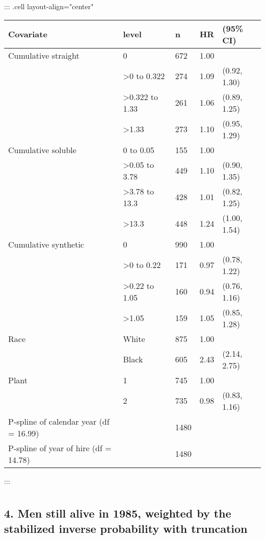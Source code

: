 \documentclass[
  11pt,
  letterpaper,
  DIV=11,
  numbers=noendperiod]{scrartcl}
\theoremstyle{remark}\newtheorem*{claim}{Claim}
\begin{document}
\begin{table}[H]
\centering
::: {.cell layout-align="center"}
\begin{tabular}{lllll}
  \toprule
Covariate & level & n & HR & (95\% CI) \\ 
  \midrule
Cumulative straight & 0 & 672 & 1.00 &  \\ 
   & >0 to 0.322 & 274 & 1.09 & (0.92, 1.30) \\ 
   & >0.322 to 1.33 & 261 & 1.06 & (0.89, 1.25) \\ 
   & >1.33 & 273 & 1.10 & (0.95, 1.29) \\ 
  Cumulative soluble & 0 to 0.05 & 155 & 1.00 &  \\ 
   & >0.05 to 3.78 & 449 & 1.10 & (0.90, 1.35) \\ 
   & >3.78 to 13.3 & 428 & 1.01 & (0.82, 1.25) \\ 
   & >13.3 & 448 & 1.24 & (1.00, 1.54) \\ 
  Cumulative synthetic & 0 & 990 & 1.00 &  \\ 
   & >0 to 0.22 & 171 & 0.97 & (0.78, 1.22) \\ 
   & >0.22 to 1.05 & 160 & 0.94 & (0.76, 1.16) \\ 
   & >1.05 & 159 & 1.05 & (0.85, 1.28) \\ 
  Race & White & 875 & 1.00 &  \\ 
   & Black & 605 & 2.43 & (2.14, 2.75) \\ 
  Plant & 1 & 745 & 1.00 &  \\ 
   & 2 & 735 & 0.98 & (0.83, 1.16) \\ 
  P-spline of calendar year (df = 16.99) &  & 1480 &  &  \\ 
  P-spline of year of hire (df = 14.78) &  & 1480 &  &  \\ 
   \bottomrule
\end{tabular}
:::
\end{table}

\hypertarget{section-6}{%
\section{}\label{section-6}}

\hypertarget{men-still-alive-in-1985-weighted-by-the-stabilized-inverse-probability-with-truncation}{%
\subsection{4. Men still alive in 1985, weighted by the stabilized
inverse probability with
truncation}\label{men-still-alive-in-1985-weighted-by-the-stabilized-inverse-probability-with-truncation}}
\end{document}
